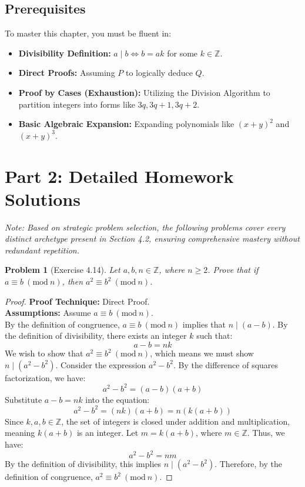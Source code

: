 \documentclass[11pt]{article}
\newtheorem{problem}{Problem}
\newcommand{\Z}{\mathbb{Z}}
\newcommand{\modulo}[1]{\ (\mathrm{mod}\ #1)}
\begin{document}
\subsection{Prerequisites}
To master this chapter, you must be fluent in:
\begin{itemize}
    \item \textbf{Divisibility Definition:} $a \mid b \iff b = ak$ for some $k \in \Z$.
    \item \textbf{Direct Proofs:} Assuming $P$ to logically deduce $Q$.
    \item \textbf{Proof by Cases (Exhaustion):} Utilizing the Division Algorithm to partition integers into forms like $3q, 3q+1, 3q+2$.
    \item \textbf{Basic Algebraic Expansion:} Expanding polynomials like $(x+y)^2$ and $(x+y)^3$.
\end{itemize}

\newpage
\section{Part 2: Detailed Homework Solutions}
\textit{Note: Based on strategic problem selection, the following problems cover every distinct archetype present in Section 4.2, ensuring comprehensive mastery without redundant repetition.}

\begin{problem}[Exercise 4.14]
Let $a, b, n \in \Z$, where $n \geq 2$. Prove that if $a \equiv b \modulo{n}$, then $a^2 \equiv b^2 \modulo{n}$.
\end{problem}
\begin{proof}
\textbf{Proof Technique:} Direct Proof. \\
\textbf{Assumptions:} Assume $a \equiv b \modulo{n}$. \\
By the definition of congruence, $a \equiv b \modulo{n}$ implies that $n \mid (a - b)$. 
By the definition of divisibility, there exists an integer $k$ such that:
\[ a - b = nk \]
We wish to show that $a^2 \equiv b^2 \modulo{n}$, which means we must show $n \mid (a^2 - b^2)$.
Consider the expression $a^2 - b^2$. By the difference of squares factorization, we have:
\[ a^2 - b^2 = (a - b)(a + b) \]
Substitute $a - b = nk$ into the equation:
\[ a^2 - b^2 = (nk)(a + b) = n(k(a + b)) \]
Since $k, a, b \in \Z$, the set of integers is closed under addition and multiplication, meaning $k(a + b)$ is an integer. Let $m = k(a + b)$, where $m \in \Z$.
Thus, we have:
\[ a^2 - b^2 = nm \]
By the definition of divisibility, this implies $n \mid (a^2 - b^2)$. 
Therefore, by the definition of congruence, $a^2 \equiv b^2 \modulo{n}$.
\end{proof}
\end{document}
